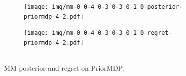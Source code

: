 \documentclass{article}
\begin{document}
\begin{appendices}
\begin{figure}[h!]
\centering
\begin{subfigure}{0.65\textwidth}
\texttt{[image: img/mm-0\_0-4\_0-3\_0-3\_0-1\_0-posterior-priormdp-4-2.pdf]}
\end{subfigure}
\begin{subfigure}{0.34\textwidth}
\texttt{[image: img/mm-0\_0-4\_0-3\_0-3\_0-1\_0-regret-priormdp-4-2.pdf]}~\\~\\
\end{subfigure}
\captionsetup{width=0.9\linewidth}
\caption{MM posterior and regret on PriorMDP.}\label{mm_priormdp_visual}
\end{figure}

\end{appendices}
\end{document}
